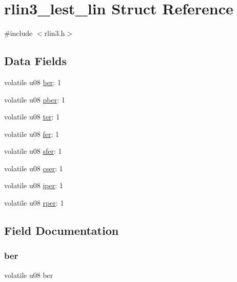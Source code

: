 \hypertarget{structrlin3__lest__lin}{}\section{rlin3\+\_\+lest\+\_\+lin Struct Reference}
\label{structrlin3__lest__lin}


{\ttfamily \#include $<$rlin3.\+h$>$}

\subsection*{Data Fields}
\begin{DoxyCompactItemize}
\item 
volatile u08 \mbox{\hyperlink{structrlin3__lest__lin_acb87d2f20052be8f94f093ea3dcc4edb}{ber}}\+: 1
\item 
volatile u08 \mbox{\hyperlink{structrlin3__lest__lin_afea6ced7b5fc0fdf1cb615e6de1ddb08}{pber}}\+: 1
\item 
volatile u08 \mbox{\hyperlink{structrlin3__lest__lin_a1f8960ec8dc96b0318949554c2b8bbb7}{ter}}\+: 1
\item 
volatile u08 \mbox{\hyperlink{structrlin3__lest__lin_ac24a35a9e7e45f5a033cf204cee0d1b0}{fer}}\+: 1
\item 
volatile u08 \mbox{\hyperlink{structrlin3__lest__lin_a2607735d128ad2fa92372c21df1a3117}{sfer}}\+: 1
\item 
volatile u08 \mbox{\hyperlink{structrlin3__lest__lin_ab713e5d9de89c3e502a9bc5a20dceaca}{cser}}\+: 1
\item 
volatile u08 \mbox{\hyperlink{structrlin3__lest__lin_ad975f3e3f22ac0521c9bb7a803f68f29}{iper}}\+: 1
\item 
volatile u08 \mbox{\hyperlink{structrlin3__lest__lin_a3f38e0d9d2dda6c385c2e98539c89a35}{rper}}\+: 1
\end{DoxyCompactItemize}


\subsection{Field Documentation}
\mbox{\label{structrlin3__lest__lin_acb87d2f20052be8f94f093ea3dcc4edb}} 
\subsubsection{\texorpdfstring{ber}{ber}}
{\footnotesize\ttfamily volatile u08 ber}

